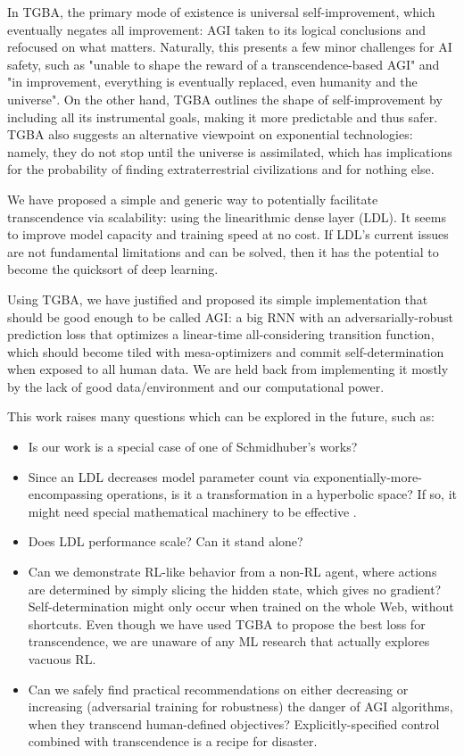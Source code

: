 \documentclass{article}
\begin{document}
In TGBA, the primary mode of existence is universal self-improvement, which eventually negates all improvement: AGI taken to its logical conclusions and refocused on what matters. Naturally, this presents a few minor challenges for AI safety, such as "unable to shape the reward of a transcendence-based AGI" and "in improvement, everything is eventually replaced, even humanity and the universe". On the other hand, TGBA outlines the shape of self-improvement by including all its instrumental goals, making it more predictable and thus safer. TGBA also suggests an alternative viewpoint on exponential technologies: namely, they do not stop until the universe is assimilated, which has implications for the probability of finding extraterrestrial civilizations and for nothing else.

We have proposed a simple and generic way to potentially facilitate transcendence via scalability: using the linearithmic dense layer (LDL). It seems to improve model capacity and training speed at no cost. If LDL's current issues are not fundamental limitations and can be solved, then it has the potential to become the quicksort of deep learning.

Using TGBA, we have justified and proposed its simple implementation that should be good enough to be called AGI: a big RNN with an adversarially-robust prediction loss that optimizes a linear-time all-considering transition function, which should become tiled with mesa-optimizers and commit self-determination when exposed to all human data. We are held back from implementing it mostly by the lack of good data/environment and our computational power.

This work raises many questions which can be explored in the future, such as:

\begin{itemize}
\item Is our work is a special case of one of Schmidhuber's works?

\item Since an LDL decreases model parameter count via exponentially-more-encompassing operations, is it a transformation in a hyperbolic space? If so, it might need special mathematical machinery to be effective \cite{peng2021hyperbolic}.

\item Does LDL performance scale? Can it stand alone?

\item Can we demonstrate RL-like behavior from a non-RL agent, where actions are determined by simply slicing the hidden state, which gives no gradient? Self-determination might only occur when trained on the whole Web, without shortcuts. Even though we have used TGBA to propose the best loss for transcendence, we are unaware of any ML research that actually explores vacuous RL.

\item Can we safely find practical recommendations on either decreasing or increasing (adversarial training for robustness) the danger of AGI algorithms, when they transcend human-defined objectives? Explicitly-specified control combined with transcendence is a recipe for disaster.
\end{itemize}
\end{document}

